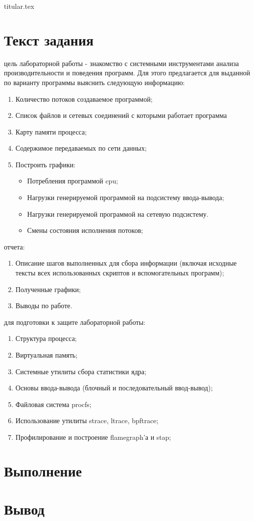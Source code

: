 \documentclass[11pt, a4paper]{article}
\begin{document}
{titular.tex}

\newpage

\section{Текст задания}
 цель лабораторной работы - знакомство с системными инструментами анализа производительности и поведения программ. Для этого предлагается для выданной по варианту программы выяснить следующую информацию:

\begin{enumerate}
  \item Количество потоков создаваемое программой;
  \item Список файлов и сетевых соединений с которыми работает программа
  \item Карту памяти процесса;
  \item Содержимое передаваемых по сети данных;
  \item Построить графики:
  \begin{itemize}
    \item Потребления программой cpu;
    \item Нагрузки генерируемой программой на подсистему ввода-вывода;
    \item Нагрузки генерируемой программой на сетевую подсистему.
    \item Смены состояния исполнения потоков;
  \end{itemize}
\end{enumerate}

\smallskip

 отчета:
\begin{enumerate}
  \item Описание шагов выполненных для сбора информации (включая исходные тексты всех использованных скриптов и вспомогательных программ);
  \item  Полученные графики;
  \item  Выводы по работе.
\end{enumerate}

 для подготовки к защите лабораторной работы:
\begin{enumerate}
  \item Структура процесса;
  \item Виртуальная память;
  \item Системные утилиты сбора статистики ядра;
  \item Основы ввода-вывода (блочный и последовательный ввод-вывод);
  \item Файловая система procfs;
  \item Использование утилиты strace, ltrace, bpftrace;
  \item Профилирование и построение flamegraph'а и stap;
\end{enumerate}

\section{Выполнение}

\section{Вывод}
\end{document}
